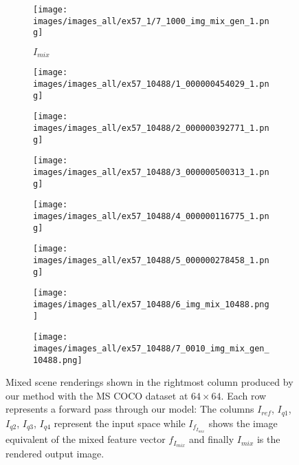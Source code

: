 \begin{figure}[h!]
     \begin{subfigure}[b]{0.135\textwidth}
         \centering
         \caption*{\textbf{$I_{mix}$}}
         \texttt{[image: images/images\_all/ex57\_1/7\_1000\_img\_mix\_gen\_1.png]}
         \label{fig:mixed_scene_ex_1_7}
     \end{subfigure}  
     \begin{subfigure}[b]{0.135\textwidth}
         \centering
         \texttt{[image: images/images\_all/ex57\_10488/1\_000000454029\_1.png]}
         \label{fig:mixed_scene_ex_2_1}
     \end{subfigure}  
     \hfill
     \begin{subfigure}[b]{0.135\textwidth}
         \centering
         \texttt{[image: images/images\_all/ex57\_10488/2\_000000392771\_1.png]}
         \label{fig:mixed_scene_ex_2_2}
     \end{subfigure}  
     \hfill
     \begin{subfigure}[b]{0.135\textwidth}
         \centering
         \texttt{[image: images/images\_all/ex57\_10488/3\_000000500313\_1.png]}
         \label{fig:mixed_scene_ex_2_3}
     \end{subfigure}  
     \hfill
     \begin{subfigure}[b]{0.135\textwidth}
         \centering
         \texttt{[image: images/images\_all/ex57\_10488/4\_000000116775\_1.png]}
         \label{fig:mixed_scene_ex_2_4}
     \end{subfigure}  
     \hfill
     \begin{subfigure}[b]{0.135\textwidth}
         \centering
         \texttt{[image: images/images\_all/ex57\_10488/5\_000000278458\_1.png]}
         \label{fig:mixed_scene_ex_2_5}
     \end{subfigure}  
     \hfill
     \begin{subfigure}[b]{0.135\textwidth}
         \centering
         \texttt{[image: images/images\_all/ex57\_10488/6\_img\_mix\_10488.png]}
         \label{fig:mixed_scene_ex_2_6}
     \end{subfigure}  
     \hfill
     \begin{subfigure}[b]{0.135\textwidth}
         \centering
         \texttt{[image: images/images\_all/ex57\_10488/7\_0010\_img\_mix\_gen\_10488.png]}
         \label{fig:mixed_scene_ex_2_7}
     \end{subfigure}  
    \caption{Mixed scene renderings shown in the rightmost column produced by our method with the MS COCO dataset at $64 \times 64$. Each row represents a forward pass through our model: The columns $I_{ref}$, $I_{q1}$, $I_{q2}$, $I_{q3}$, $I_{q4}$ represent the input space while $I_{f_{I_{mix}}}$ shows the image equivalent of the mixed feature vector $f_{I_{mix}}$ and finally $I_{mix}$ is the rendered output image.}
    \label{fig:results_lorbms_mixed_scenes}
\end{figure}